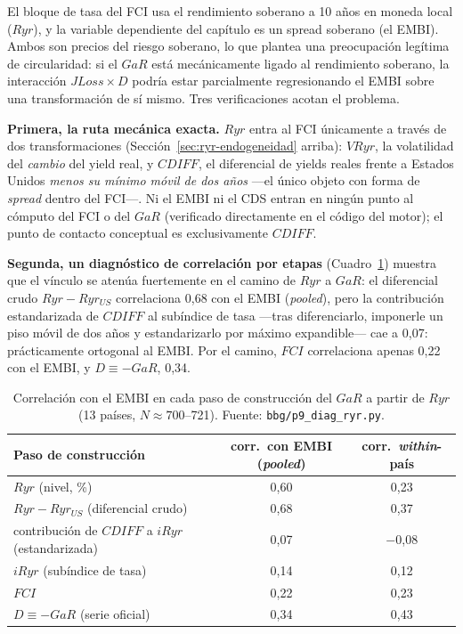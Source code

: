 El bloque de tasa del FCI usa el rendimiento soberano a 10 años en moneda local ($Ryr$), y la variable dependiente del capítulo es un spread soberano (el EMBI). Ambos son precios del riesgo soberano, lo que plantea una preocupación legítima de circularidad: si el $GaR$ está mecánicamente ligado al rendimiento soberano, la interacción $JLoss\times D$ podría estar parcialmente regresionando el EMBI sobre una transformación de sí mismo. Tres verificaciones acotan el problema.

\textbf{Primera, la ruta mecánica exacta.} $Ryr$ entra al FCI únicamente a través de dos transformaciones (Sección~\ref{sec:ryr-endogeneidad} arriba): $VRyr$, la volatilidad del \emph{cambio} del yield real, y $CDIFF$, el diferencial de yields reales frente a Estados Unidos \emph{menos su mínimo móvil de dos años} —el único objeto con forma de \textit{spread} dentro del FCI—. Ni el EMBI ni el CDS entran en ningún punto al cómputo del FCI o del $GaR$ (verificado directamente en el código del motor); el punto de contacto conceptual es exclusivamente $CDIFF$.

\textbf{Segunda, un diagnóstico de correlación por etapas} (Cuadro~\ref{tab:diagryr}) muestra que el vínculo se atenúa fuertemente en el camino de $Ryr$ a $GaR$: el diferencial crudo $Ryr-Ryr_{US}$ correlaciona 0,68 con el EMBI (\textit{pooled}), pero la contribución estandarizada de $CDIFF$ al subíndice de tasa —tras diferenciarlo, imponerle un piso móvil de dos años y estandarizarlo por máximo expandible— cae a 0,07: prácticamente ortogonal al EMBI. Por el camino, $FCI$ correlaciona apenas 0,22 con el EMBI, y $D\equiv-GaR$, 0,34.

\begin{table}[t]
\centering\small
\begin{tabular}{lcc}
\toprule
Paso de construcción & corr.\ con EMBI (\textit{pooled}) & corr.\ \textit{within}-país \\
\midrule
$Ryr$ (nivel, \%) & 0,60 & 0,23 \\
$Ryr-Ryr_{US}$ (diferencial crudo) & 0,68 & 0,37 \\
contribución de $CDIFF$ a $iRyr$ (estandarizada) & 0,07 & $-$0,08 \\
$iRyr$ (subíndice de tasa) & 0,14 & 0,12 \\
$FCI$ & 0,22 & 0,23 \\
$D\equiv-GaR$ (serie oficial) & 0,34 & 0,43 \\
\bottomrule
\end{tabular}
\caption[Atenuación del vínculo Ryr--EMBI]{Correlación con el EMBI en cada paso de construcción del $GaR$ a partir de $Ryr$ (13 países, $N\approx 700$--721). Fuente: \texttt{bbg/p9\_diag\_ryr.py}.}
\label{tab:diagryr}
\end{table}

